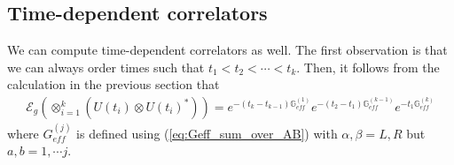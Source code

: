 \documentclass{article}
\theoremstyle{definition}
\newcommand{\nn}{\nonumber}
\newcommand{\lb}{\left(}
\newcommand{\rb}{\right)}
\newcommand{\mO}{\mathcal{O}}
\begin{document}

    \subsection{Time-dependent correlators}

    We can compute time-dependent correlators as well. The first observation is that
    we can always order times such that $t_{1}<t_{2}<\cdots <t_{k}$. Then, it follows
    from the calculation in the previous section that
    \begin{eqnarray}
        \mathcal{E}_g\lb\otimes_{i=1}^k \lb U(t_i)\otimes U(t_i)^*\rb\rb=e^{-(t_k-t_{k-1}) \mathbb{G}^{(1)}_{eff}}e^{-(t_2-t_1)\mathbb{G}^{(k-1)}_{eff}}e^{-t_1\mathbb{G}^{(k)}_{eff}}
    \end{eqnarray}
    where $G_{eff}^{(j)}$ is defined using (\ref{eq:Geff_sum_over_AB}) with $\alpha
    ,\beta=L,R$ but $a,b=1,\cdots j$.
\end{document}
